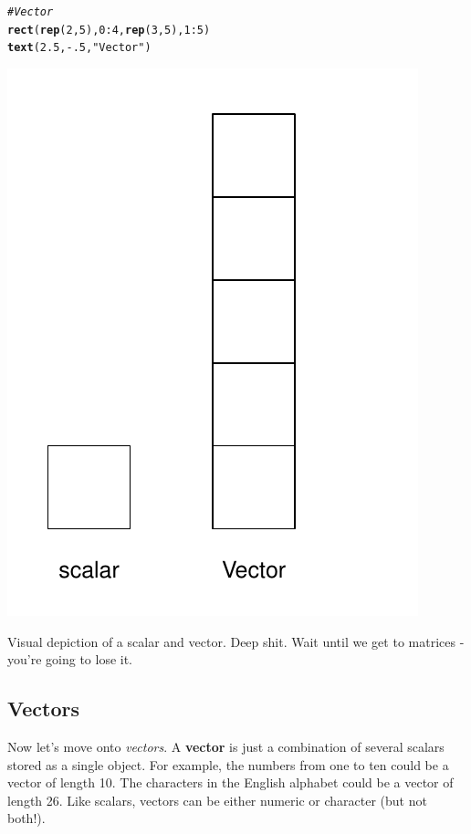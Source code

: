 \documentclass{tufte-book}\usepackage[]{graphicx}\usepackage[]{color}
\makeatletter
\def\maxwidth{ %
  \ifdim\Gin@nat@width>\linewidth
    \linewidth
  \else
    \Gin@nat@width
  \fi
}
\newcommand{\hlnum}[1]{\textcolor[rgb]{0.686,0.059,0.569}{#1}}%
\newcommand{\hlstr}[1]{\textcolor[rgb]{0.192,0.494,0.8}{#1}}%
\newcommand{\hlcom}[1]{\textcolor[rgb]{0.678,0.584,0.686}{\textit{#1}}}%
\newcommand{\hlopt}[1]{\textcolor[rgb]{0,0,0}{#1}}%
\newcommand{\hlstd}[1]{\textcolor[rgb]{0.345,0.345,0.345}{#1}}%
\newcommand{\hlkwd}[1]{\textcolor[rgb]{0.737,0.353,0.396}{\textbf{#1}}}%
\newenvironment{kframe}{%
 \def\at@end@of@kframe{}%
 \ifinner\ifhmode%
  \def\at@end@of@kframe{\end{minipage}}%
  \begin{minipage}{\columnwidth}%
 \fi\fi%
 \def\FrameCommand##1{\hskip\@totalleftmargin \hskip-\fboxsep
 \colorbox{shadecolor}{##1}\hskip-\fboxsep
     \hskip-\linewidth \hskip-\@totalleftmargin \hskip\columnwidth}%
 \MakeFramed {\advance\hsize-\width
   \@totalleftmargin\z@ \linewidth\hsize
   \@setminipage}}%
 {\par\unskip\endMakeFramed%
 \at@end@of@kframe}
\newenvironment{knitrout}{}{} %
\makeatother
\begin{document}
\begin{marginfigure}
\begin{tiny}
\begin{knitrout}
\begin{kframe}
\begin{alltt}
\hlcom{# Vector}
\hlkwd{rect}\hlstd{(}\hlkwd{rep}\hlstd{(}\hlnum{2}\hlstd{,} \hlnum{5}\hlstd{),} \hlnum{0}\hlopt{:}\hlnum{4}\hlstd{,} \hlkwd{rep}\hlstd{(}\hlnum{3}\hlstd{,} \hlnum{5}\hlstd{),} \hlnum{1}\hlopt{:}\hlnum{5}\hlstd{)}
\hlkwd{text}\hlstd{(}\hlnum{2.5}\hlstd{,} \hlopt{-}\hlnum{.5}\hlstd{,} \hlstr{"Vector"}\hlstd{)}
\end{alltt}
\end{kframe}
\includegraphics[width=\maxwidth]{figure/unnamed-chunk-32-1} 

\end{knitrout}
\caption{Visual depiction of a scalar and vector. Deep shit. Wait until we get to matrices - you're going to lose it.}
\label{fig:scalarvector}
\end{tiny}
\end{marginfigure}

\subsection{Vectors}

Now let's move onto \textit{vectors}. A \textbf{vector} is just a combination of several scalars stored as a single object. For example, the numbers from one to ten could be a vector of length 10. The characters in the English alphabet could be a vector of length 26. Like scalars, vectors can be either numeric or character (but not both!).
\end{document}
